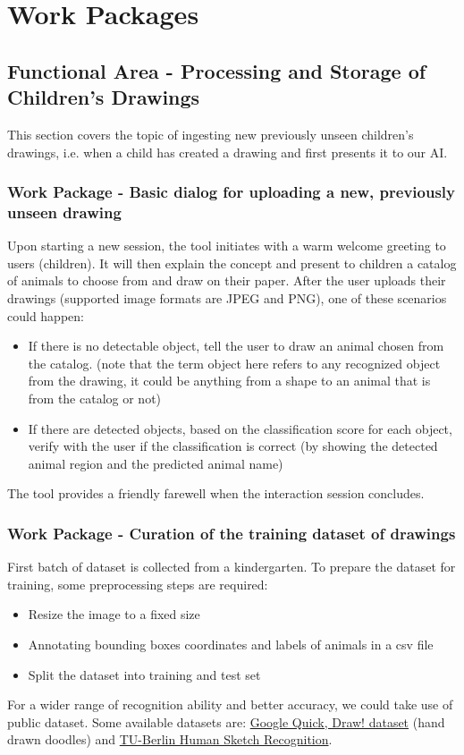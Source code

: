 \section{Work Packages}

\subsection{Functional Area - Processing and Storage of Children's Drawings}
This section covers the topic of ingesting new previously unseen children's drawings, i.e. when a child has created a drawing and first presents it to our AI.

\subsubsection{Work Package - Basic dialog for uploading a new, previously unseen drawing}
Upon starting a new session, the tool initiates with a warm welcome greeting to users (children). It will then explain the concept and present to children a catalog of animals to choose from and draw on their paper.
After the user uploads their drawings (supported image formats are JPEG and PNG), one of these scenarios could happen:
\begin{itemize}
\item If there is no detectable object, tell the user to draw an animal chosen from the catalog. (note that the term object here refers to any recognized object from the drawing, it could be anything from a shape to an animal that is from the catalog or not)
\item If there are detected objects, based on the classification score for each object, verify with the user if the classification is correct (by showing the detected animal region and the predicted animal name)
\end{itemize}
The tool provides a friendly farewell when the interaction session concludes.

\subsubsection{Work Package - Curation of the training dataset of drawings}
First batch of dataset is collected from a kindergarten.
To prepare the dataset for training, some preprocessing steps are required:
\begin{itemize}
\item Resize the image to a fixed size
\item Annotating bounding boxes coordinates and labels of animals in a csv file
\item Split the dataset into training and test set
\end{itemize}
For a wider range of recognition ability and better accuracy, we could take use of public dataset. Some available datasets are: \href{https://github.com/googlecreativelab/quickdraw-dataset}{Google Quick, Draw! dataset} (hand drawn doodles) and \href{https://cybertron.cg.tu-berlin.de/eitz/projects/classifysketch/}{TU-Berlin Human Sketch Recognition}.


